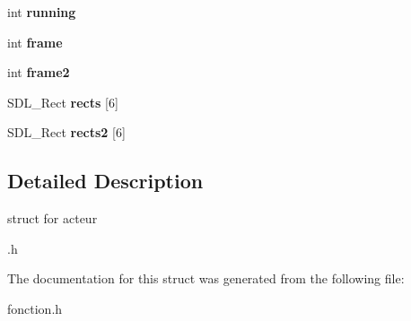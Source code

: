 \begin{DoxyCompactItemize}
int {\bfseries running}
\item 
\mbox{\label{structacteur_a87455e611fc9af834ea83a4a5ab199c4}} 
int {\bfseries frame}
\item 
\mbox{\label{structacteur_a7b008418c15f7c00e8c739ec5b54455a}} 
int {\bfseries frame2}
\item 
\mbox{\label{structacteur_a150a7440132dce14893aafd9b07ea9eb}} 
S\+D\+L\+\_\+\+Rect {\bfseries rects} \mbox{[}6\mbox{]}
\item 
\mbox{\label{structacteur_a4ffa8e822a42e0ecbb80cc2af747e327}} 
S\+D\+L\+\_\+\+Rect {\bfseries rects2} \mbox{[}6\mbox{]}
\end{DoxyCompactItemize}


\subsection{Detailed Description}
struct for acteur 

.h 

The documentation for this struct was generated from the following file\+:\begin{DoxyCompactItemize}
\item 
fonction.\+h\end{DoxyCompactItemize}
